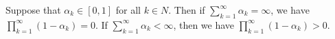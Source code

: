 Suppose that $\alpha_k \in [0, 1]$ for all $k \in N$. Then if $\sum_{k=1}^{\infty} \alpha_k = \infty$, we have $\prod_{k=1}^{\infty}(1 - \alpha_k) = 0$. If $\sum_{k=1}^{\infty} \alpha_k < \infty$, then we have $\prod_{k=1}^{\infty}(1 - \alpha_k) > 0$.